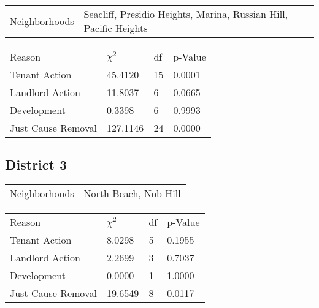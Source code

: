 \documentclass[]{article}
\begin{document}
\begin{table}[h]
	\centering
	\begin{tabular}{l | l}
		Neighborhoods & Seacliff, Presidio Heights, Marina, Russian Hill, Pacific Heights \\
	\end{tabular}
\end{table}
\FloatBarrier

\begin {table}[h]
\centering
\begin{tabular}{l | l | l | l}
	
	Reason	&  $\chi ^{2}$ & df & p-Value \\
	Tenant Action 		 & 45.4120 &  15   & 0.0001 		\\
	Landlord Action	     & 11.8037 &  6     &  	0.0665	\\
	Development			 & 0.3398 &  6    &  0.9993		\\
	Just Cause Removal	 & 127.1146   &  24 &  	0.0000		\\
\end{tabular} \newline
\end{table}
\FloatBarrier

\subsection{District 3}

\begin{table}[h]
	\centering
	\begin{tabular}{l | l}
		Neighborhoods & North Beach, Nob Hill \\
	\end{tabular}
\end{table}
\FloatBarrier

\begin {table}[h]
\centering
\begin{tabular}{l | l | l | l}
	
	Reason	&  $\chi ^{2}$ & df & p-Value \\
	Tenant Action 		  & 8.0298 &  5  &  0.1955    \\
	Landlord Action	      & 2.2699 &  3  &  0.7037    \\
	Development			  & 0.0000 &  1  &  1.0000    \\
	Just Cause Removal	  & 19.6549 &  8  &  0.0117    \\
\end{tabular} \newline
\end{table}
\FloatBarrier
\end{document}
